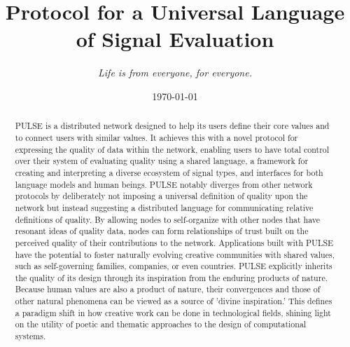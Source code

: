 \documentclass{article}
\title{Protocol for a Universal Language of Signal Evaluation}
\author{\textit{Life is from everyone, for everyone.}}
\date{\today}
\begin{document}
\maketitle

\begin{abstract}
    PULSE is a distributed network designed to help its users define their core values and to connect users with similar values. It achieves this with a novel protocol for expressing the quality of data within the network, enabling users to have total control over their system of evaluating quality using a shared language, a framework for creating and interpreting a diverse ecosystem of signal types, and interfaces for both language models and human beings. PULSE notably diverges from other network protocols by deliberately not imposing a universal definition of quality upon the network but instead suggesting a distributed language for communicating relative definitions of quality. By allowing nodes to self-organize with other nodes that have resonant ideas of quality data, nodes can form relationships of trust built on the perceived quality of their contributions to the network. Applications built with PULSE have the potential to foster naturally evolving creative communities with shared values, such as self-governing families, companies, or even countries. PULSE explicitly inherits the quality of its design through its inspiration from the enduring products of nature. Because human values are also a product of nature, their convergences and those of other natural phenomena can be viewed as a source of 'divine inspiration.' This defines a paradigm shift in how creative work can be done in technological fields, shining light on the utility of poetic and thematic approaches to the design of computational systems.
\end{abstract}
\end{document}
